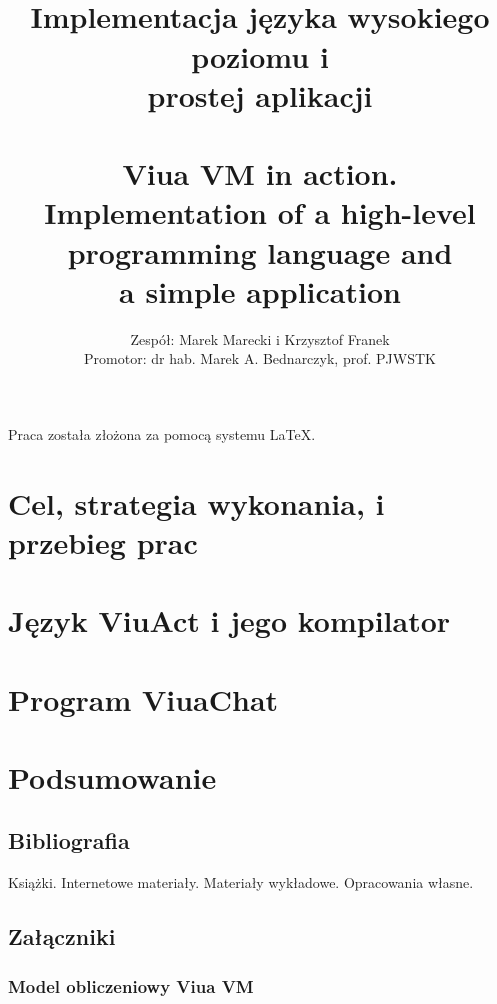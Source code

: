 \documentclass[11pt,oneside,a4paper,titlepage,onecolumn]{book}
\author{Zespół: Marek Marecki i Krzysztof Franek\\Promotor: dr hab. Marek A. Bednarczyk, prof. PJWSTK}
\title{%
    \inzmaintitlePL \\
    \large
    Implementacja języka wysokiego poziomu i \\
    prostej aplikacji\\
    ~\\
    Viua VM in action.\\
    Implementation of a high-level programming language and\\ a simple application}
\begin{document}

\maketitle

\tableofcontents
\listoffigures

Praca została złożona za pomocą systemu \LaTeX.

\newpage

\part{Cel, strategia wykonania, i przebieg prac}







\part{Język ViuAct i jego kompilator}







\part{Program ViuaChat}





\part{Podsumowanie}





\chapter{Bibliografia}

Książki. Internetowe materiały. Materiały wykładowe. Opracowania własne.


% 
% 
% 


\chapter{Załączniki}



\section{Model obliczeniowy Viua VM}
\label{appendix_viua_vm_execution_model}
\end{document}

